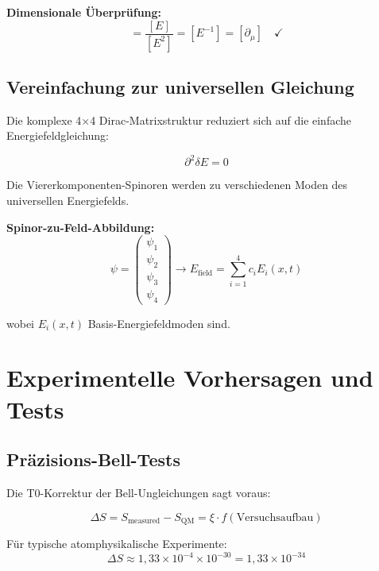 \documentclass[12pt,a4paper]{report}
\begin{document}
	\textbf{Dimensionale Überprüfung:}
	\begin{equation}
		[\Gamma_\mu^{(T)}] = \frac{[E]}{[E^2]} = [E^{-1}] = [\partial_\mu] \quad \checkmark
	\end{equation}
	
	\subsection{Vereinfachung zur universellen Gleichung}
	\label{subsec:dirac_simplification}
	
	Die komplexe 4×4 Dirac-Matrixstruktur reduziert sich auf die einfache Energiefeldgleichung:
	
	\begin{equation}
		\partial^2 \delta E = 0
	\end{equation}
	
	Die Viererkomponenten-Spinoren werden zu verschiedenen Moden des universellen Energiefelds.
	
	\textbf{Spinor-zu-Feld-Abbildung:}
	\begin{equation}
		\psi = \begin{pmatrix} \psi_1 \\ \psi_2 \\ \psi_3 \\ \psi_4 \end{pmatrix} \rightarrow E_{\text{field}} = \sum_{i=1}^4 c_i E_i(x,t)
	\end{equation}
	
	wobei $E_i(x,t)$ Basis-Energiefeldmoden sind.
	
	\section{Experimentelle Vorhersagen und Tests}
	\label{sec:experimental_predictions}
	
	\subsection{Präzisions-Bell-Tests}
	\label{subsec:precision_bell_tests}
	
	Die T0-Korrektur der Bell-Ungleichungen sagt voraus:
	
	\begin{equation}
		\Delta S = S_{\text{measured}} - S_{\text{QM}} = \xi \cdot f(\text{Versuchsaufbau})
	\end{equation}
	
	Für typische atomphysikalische Experimente:
	\begin{equation}
		\Delta S \approx 1,33 \times 10^{-4} \times 10^{-30} = 1,33 \times 10^{-34}
	\end{equation}
	
\end{document}
